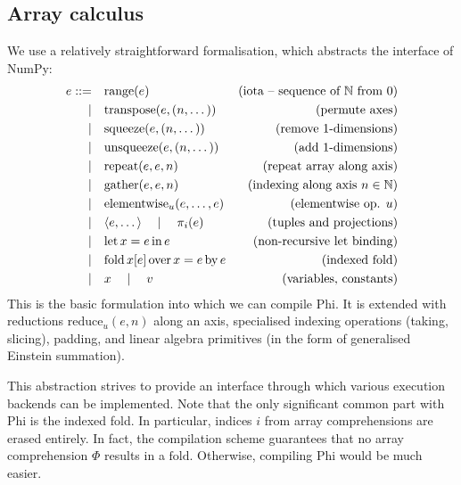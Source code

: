 \subsection{Array calculus}


We use a relatively straightforward formalisation, which abstracts the interface of NumPy:
\begin{align*}
e ::=&\quad \mathrm{range}(e)   &\text{(iota -- sequence of }\mathbb N\text{ from }0\text{)} \\
\mid&\quad \mathrm{transpose}(e, (n, \dots)) &\text{(permute axes)} \\ 
\mid&\quad \mathrm{squeeze}(e, (n, \dots)) &\text{(remove 1-dimensions)} \\
\mid&\quad \mathrm{unsqueeze}(e, (n, \dots)) &\text{(add 1-dimensions)} \\
\mid&\quad \mathrm{repeat}(e, e, n) &\text{(repeat array along axis)} \\
\mid&\quad \mathrm{gather}(e, e, n) &\text{(indexing along axis }n \in \mathbb N\text{)} \\ 
\mid&\quad \mathrm{elementwise}_u(e, \dots, e) &\text{(elementwise op. }u\text{)} \\
\mid&\quad \langle e, \dots \rangle \quad\mid\quad \pi_i(e) &\text{(tuples and projections)} \\
\mid&\quad \mathrm{let}\,{x}={e}\,\mathrm{in}\,{e} &\text{(non-recursive let binding)} \\
\mid&\quad \mathrm{fold}\,{x}[{e}]\,\mathrm{over}\,{x} = {e}\,\mathrm{by}\,{e} &\text{(indexed fold)} \\
\mid&\quad x \quad\mid\quad v  &\text{(variables, constants)}
\end{align*}
This is the basic formulation into which we can compile Phi. It is extended with reductions $\mathrm{reduce}_u(e, n)$ along an axis, specialised indexing operations (taking, slicing), padding, and linear algebra primitives (in the form of generalised Einstein summation).

This abstraction strives to provide an interface through which various execution backends can be implemented. Note that the only significant common part with Phi is the indexed fold. In particular, indices $i$ from array comprehensions are erased entirely. In fact, the compilation scheme guarantees that no array comprehension $\Phi$ results in a $\mathrm{fold}$. Otherwise, compiling Phi would be much easier.

